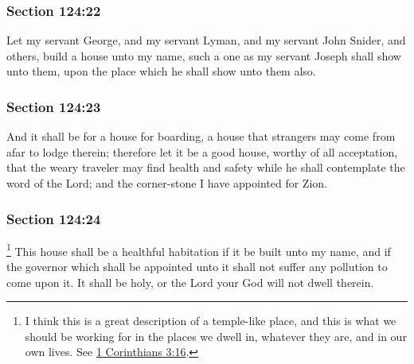 	\subsubsection{Section 124:22} %
		\label{DC124-22}

		Let my servant George, and my servant Lyman, and my servant John Snider, and others, build a house unto my name, such a one as my servant Joseph shall show unto them, upon the place which he shall show unto them also.


	\subsubsection{Section 124:23} %
		\label{DC124-23}

		And it shall be for a house for boarding, a house that strangers may come from afar to lodge therein; therefore let it be a good house, worthy of all acceptation, that the weary traveler may find health and safety while he shall contemplate the word of the Lord; and the corner-stone I have appointed for Zion.


	\subsubsection{Section 124:24} %
		\label{DC124-24}

			\footnote{%
				I think this is a great description of a temple-like place, and this is what we should be working for in the places we dwell in, whatever they are, and in our own lives. See \hyperref[1CORINTHIANS-3-16]{1 Corinthians 3:16}.
				}%
		This house shall be a healthful habitation if it be built unto my name, and if the governor which shall be appointed unto it shall not suffer any pollution to come upon it.  It shall be holy, or the Lord your God will not dwell therein.

